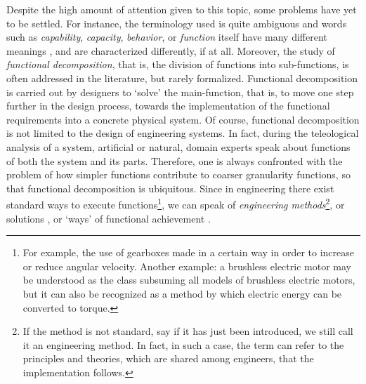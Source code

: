 \documentclass[sw]{iosart2x}
\newcommand{\firstTimeKeyWord}[1]{\textit{#1}}
\newcommand{\quotes}[1]{`#1'}
\newcommand{\myComment}[1]{}
\begin{document}
Despite the high amount of attention given to this topic, some problems have yet to be settled. 
For instance, the terminology used is quite ambiguous and words such as \firstTimeKeyWord{capability}, \firstTimeKeyWord{capacity}, \firstTimeKeyWord{behavior}, or \firstTimeKeyWord{function} itself have many different meanings \cite{borgoCapabilitiesCapacitiesFunctionalities2021, erdenReviewFunctionModeling2008}, and are characterized differently, if at all\myComment{, depending on the author}.
Moreover, the study of \firstTimeKeyWord{functional decomposition}, that is, the division of functions into sub-functions, is often addressed in the literature, but rarely formalized.
Functional decomposition is carried out by designers to \quotes{solve} the main-function, that is, to move one step further in the design process, towards the implementation of the functional requirements into a concrete physical system.
Of course, functional decomposition is not limited to the design of engineering systems. 
In fact, during the teleological analysis of a system, artificial or natural, domain experts speak about functions of both the system and its parts.
Therefore, one is always confronted with the problem of how simpler functions contribute to coarser granularity functions, so that functional decomposition is ubiquitous. %
Since in engineering there exist standard ways to execute functions\myComment{meglio->In the engineering domain, functional decomposition has unique characteristics: for example, since in engineering there exist standard ways to solve functions through decomposition}\footnote{For example, the use of gearboxes made in a certain way in order to increase or reduce angular velocity. Another example: a brushless electric motor may be understood as the class subsuming all models of brushless electric motors, but it can also be recognized as a method by which electric energy can be converted to torque.}, we can speak of \firstTimeKeyWord{engineering methods}\footnote{If the method is not standard, say if it has just been introduced, we still call it an engineering method. In fact, in such a case, the term can refer to the principles and theories, which are shared among engineers, that the implementation follows.}, or solutions \cite{pahl_engineering_2007}, or `ways' of functional achievement \cite{kitamuraOntologicalModelDevice2006}. \myComment{, the last two terms taken from \cite{pahl_engineering_2007} and \cite{kitamuraOntologicalModelDevice2006} respectively}   
\end{document}
